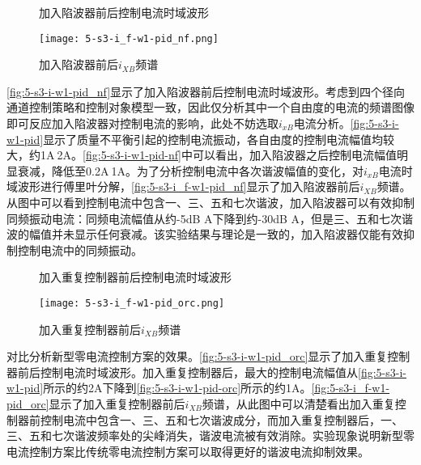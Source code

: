 \documentclass[
  lang=cn,
  degree=master,
  openany,oneside
]{nuaathesis}
\begin{document}
\begin{figure}[h!]  
	\quad  
	\caption{加入陷波器前后控制电流时域波形}  \label{fig:5-s3-i-w1-pid_nf}\end{figure}
	
\begin{figure}[h!]
	\texttt{[image: 5-s3-i\_f-w1-pid\_nf.png]}
	\caption{加入陷波器前后$i_{XB}$频谱}
	\label{fig:5-s3-i_f-w1-pid_nf}
\end{figure}

\autoref{fig:5-s3-i-w1-pid_nf}显示了加入陷波器前后控制电流时域波形。考虑到四个径向通道控制策略和控制对象模型一致，因此仅分析其中一个自由度的电流的频谱图像即可反应加入陷波器对控制电流的影响，此处不妨选取$i_{xB}$电流分析。\autoref{fig:5-s3-i-w1-pid}显示了质量不平衡引起的控制电流振动，各自由度的控制电流幅值均较大，约1A$~$2A。\autoref{fig:5-s3-i-w1-pid-nf}中可以看出，加入陷波器之后控制电流幅值明显衰减，降低至0.2A$~$1A。为了分析控制电流中各次谐波幅值的变化，对$i_{xB}$电流时域波形进行傅里叶分解，\autoref{fig:5-s3-i_f-w1-pid_nf}显示了加入陷波器前后$i_{XB}$频谱。从图中可以看到控制电流中包含一、三、五和七次谐波，加入陷波器可以有效抑制同频振动电流：同频电流幅值从约-5dB A下降到约-30dB A，但是三、五和七次谐波的幅值并未显示任何衰减。该实验结果与理论是一致的，加入陷波器仅能有效抑制控制电流中的同频振动。

\begin{figure}[h!]  
	\quad  
	\caption{加入重复控制器前后控制电流时域波形}  \label{fig:5-s3-i-w1-pid_orc}
\end{figure}

\begin{figure}[h!]
	\texttt{[image: 5-s3-i\_f-w1-pid\_orc.png]}
	\caption{加入重复控制器前后$i_{XB}$频谱}
	\label{fig:5-s3-i_f-w1-pid_orc}
\end{figure}

对比分析新型零电流控制方案的效果。\autoref{fig:5-s3-i-w1-pid_orc}显示了加入重复控制器前后控制电流时域波形。加入重复控制器后，最大的控制电流幅值从\autoref{fig:5-s3-i-w1-pid}所示的约2A下降到\autoref{fig:5-s3-i-w1-pid-orc}所示的约1A。\autoref{fig:5-s3-i_f-w1-pid_orc}显示了加入重复控制器前后$i_{XB}$频谱，从此图中可以清楚看出加入重复控制器前控制电流中包含一、三、五和七次谐波成分，而加入重复控制器后，一、三、五和七次谐波频率处的尖峰消失，谐波电流被有效消除。实验现象说明新型零电流控制方案比传统零电流控制方案可以取得更好的谐波电流抑制效果。
\end{document}
